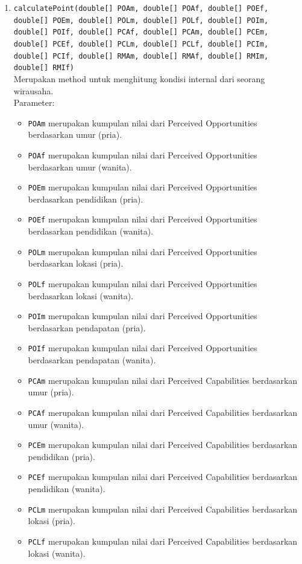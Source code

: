 \begin{enumerate}
			\item \texttt{calculatePoint(double[] POAm, double[] POAf, double[] POEf, double[] POEm, double[] POLm, double[] POLf, double[] POIm, double[] POIf, double[] PCAf, double[] PCAm, double[] PCEm, double[] PCEf, double[] PCLm, double[] PCLf, double[] PCIm, double[] PCIf, double[] RMAm, double[] RMAf, double[] RMIm, double[] RMIf)}\\
			Merupakan method untuk menghitung kondisi internal dari seorang wirausaha.\\
			Parameter:
			\begin{itemize}
				\item \texttt{POAm} merupakan kumpulan nilai dari Perceived Opportunities berdasarkan umur (pria).
				\item \texttt{POAf} merupakan kumpulan nilai dari Perceived Opportunities berdasarkan umur (wanita).
				\item \texttt{POEm} merupakan kumpulan nilai dari Perceived Opportunities berdasarkan pendidikan (pria).
				\item \texttt{POEf} merupakan kumpulan nilai dari Perceived Opportunities berdasarkan pendidikan (wanita).
				\item \texttt{POLm} merupakan kumpulan nilai dari Perceived Opportunities berdasarkan lokasi (pria).
				\item \texttt{POLf} merupakan kumpulan nilai dari Perceived Opportunities berdasarkan lokasi (wanita).
				\item \texttt{POIm} merupakan kumpulan nilai dari Perceived Opportunities berdasarkan pendapatan (pria).
				\item \texttt{POIf} merupakan kumpulan nilai dari Perceived Opportunities berdasarkan pendapatan (wanita).
				\item \texttt{PCAm} merupakan kumpulan nilai dari Perceived Capabilities berdasarkan umur (pria).
				\item \texttt{PCAf} merupakan kumpulan nilai dari Perceived Capabilities berdasarkan umur (wanita).
				\item \texttt{PCEm} merupakan kumpulan nilai dari Perceived Capabilities berdasarkan pendidikan (pria).
				\item \texttt{PCEf} merupakan kumpulan nilai dari Perceived Capabilities berdasarkan pendidikan (wanita).
				\item \texttt{PCLm} merupakan kumpulan nilai dari Perceived Capabilities berdasarkan lokasi (pria).
				\item \texttt{PCLf} merupakan kumpulan nilai dari Perceived Capabilities berdasarkan lokasi (wanita).

\end{itemize}
\end{enumerate}

